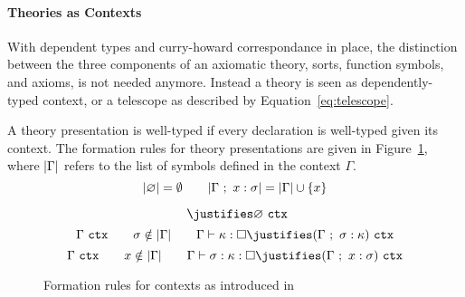 \paragraph{Theories as Contexts}
With dependent types and curry-howard correspondance in place, the distinction between the three components of an axiomatic theory, sorts, function symbols, and axioms, is not needed anymore. Instead a theory is seen as dependently-typed context, or a telescope as described by Equation~\ref{eq:telescope}. 


A theory presentation is well-typed if every declaration  is well-typed given its context. The formation rules for theory presentations are given in Figure~\ref{fig:ctx}, where $| \Gamma |$ refers to the list of symbols defined in the context $\Gamma$. 
$$ | \varnothing | = \emptyset \qquad
| \Gamma\ ;\ x : \sigma | = | \Gamma | \cup \left\{ x \right\}
$$
\begin{figure}[ht]
    \begin{proofrules}
        \[ \ \justifies \varnothing \ \wfctx \]
        \[ \context{\Gamma}\ \wfctx \qquad \sigma \notin \syms{\context{\Gamma}}
        \qquad \context{\Gamma} \vdash \kappa : \Box \justifies
        (\context{\Gamma}\ ;\ \sigma : \kappa)\ \wfctx \]
        \[ \context{\Gamma}\ \wfctx \qquad x\notin \syms{\context{\Gamma}}
        \qquad \context{\Gamma} \vdash \sigma : \kappa : \Box \justifies
        (\context{\Gamma}\ ;\ x : \sigma)\ \wfctx \]
    \end{proofrules}
    \caption{Formation rules for contexts as introduced in~\cite{carette2018building}}
    \label{fig:ctx}
\end{figure}

